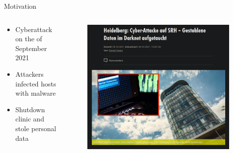
\begin{frame}{Motivation}
    \begin{columns}[T]
        \begin{column}{0.5\textwidth}
            \begin{itemize}
                \item Cyberattack on the  of September 2021
                \item Attackers infected hosts with malware
                \item Shutdown clinic and stole personal data
            \end{itemize}
        \end{column}
        \begin{column}{0.5\textwidth}
            \begin{figure}
                \centering
                \includegraphics[width=\columnwidth]{img/srh-attack.png}
                \caption{\cite{Hagen2021}}
            \end{figure}
        \end{column}
    \end{columns}
\end{frame}

